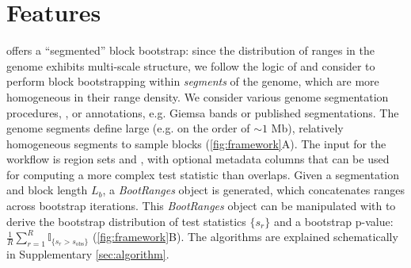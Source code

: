 \section{Features}

\bootranges offers a ``segmented'' block bootstrap:
since the distribution of ranges in the genome exhibits multi-scale
structure, we follow the logic of \citet{bickel2010subsampling} and consider to
perform block bootstrapping within \textit{segments} of the genome, which are
more homogeneous in their range density.
We consider various genome segmentation procedures, ,
or  annotations, e.g. Giemsa bands or published segmentations.
The genome segments define large (e.g. on the order of ${\sim}1$ Mb),
relatively homogeneous segments  to sample blocks
(\cref{fig:framework}A).
The input for the workflow is region sets  and
, with optional metadata columns that can be
used for computing a more complex test statistic than overlaps.
Given a segmentation and block length $L_b$, a \textit{BootRanges}
object is generated, which concatenates ranges across bootstrap
iterations. This \textit{BootRanges} object can be manipulated with \plyranges
to derive the bootstrap distribution of test statistics $\{s_r\}$ and a
bootstrap p-value:
$ \frac{1}{R} \sum_{r=1}^R \mathbb{I}_{\{s_r > s_\text{obs}\}} $ (\cref{fig:framework}B).
The \bootranges algorithms are explained schematically in Supplementary \cref{sec:algorithm}.



